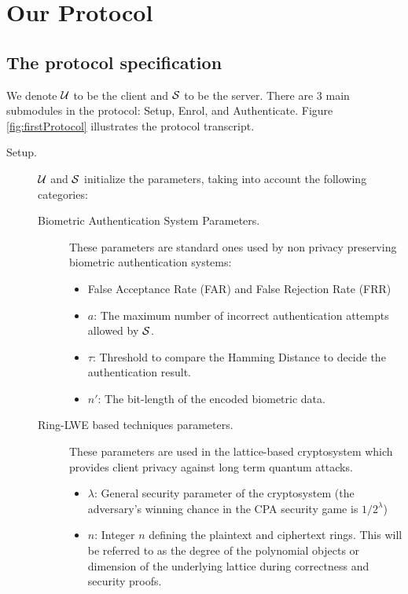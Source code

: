\section{Our Protocol}
\label{sec:our_protocol}

\subsection{The protocol specification}
\label{sec:protocol1specs}

We denote $\mathcal{U}$ to be the client and $\mathcal{S}$ to be the server. There are 3
main submodules in the protocol: Setup, Enrol, and Authenticate. Figure \ref{fig:firstProtocol} illustrates the protocol transcript.
\begin{description}
\item[Setup.] $\mathcal{U}$ and $\mathcal{S}$ initialize the parameters, taking into account the following categories:
  \begin{description}
  \item[Biometric Authentication System Parameters.] These parameters are standard ones used by non privacy preserving
    biometric authentication systems:
    \begin{itemize}
    \item False Acceptance Rate (FAR) and False Rejection Rate (FRR)
    \item $a$: The maximum number of incorrect authentication attempts allowed by $\mathcal{S}$.
    \item $\tau$: Threshold to compare the Hamming Distance to decide the authentication result.
    \item \(n'\): The bit-length of the encoded
      biometric data.
    \end{itemize}
  \item[Ring-LWE based techniques parameters.] These parameters are used in the lattice-based cryptosystem which provides
    client privacy against long term quantum attacks.
    \begin{itemize}
    \item $\lambda$: General security parameter of the cryptosystem (the adversary's winning chance in the CPA security game is \(1/2^{\lambda}\))
    \item $n$: Integer $n$ defining the plaintext and ciphertext rings. This will be referred to as the degree of
      the polynomial objects or dimension of the underlying lattice during correctness and security proofs.

\end{itemize}
\end{description}
\end{description}
